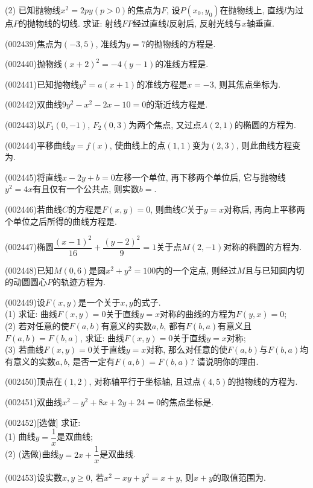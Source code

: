 (2) 已知抛物线$x^2=2py(p>0)$的焦点为$F$,
设$P(x_0,y_0)$在抛物线上, 直线$l$为过点$P$的抛物线的切线. 求证: 射线$FP$经过直线$l$反射后, 反射光线与$x$轴垂直.
\item (002439)焦点为$(-3,5)$, 准线为$y=7$的抛物线的方程是.
\item (002440)抛物线$(x+2)^2=-4(y-1)$的准线方程是.
\item (002441)已知抛物线$y^2=a(x+1)$的准线方程是$x=-3$, 则其焦点坐标为.
\item (002442)双曲线$9y^2-x^2-2x-10=0$的渐近线方程是.
\item (002443)以$F_1(0,-1)$, $F_2(0,3)$为两个焦点, 又过点$A(2,1)$的椭圆的方程为.
\item (002444)平移曲线$y=f(x)$, 使曲线上的点$(1,1)$变为$(2,3)$, 则此曲线方程变为.
\item (002445)将直线$x-2y+b=0$左移一个单位, 再下移两个单位后, 它与抛物线$y^2=4x$有且仅有一个公共点, 则实数$b=$.
\item (002446)若曲线$C$的方程是$F(x,y)=0$, 则曲线$C$关于$y=x$对称后,
再向上平移两个单位之后所得的曲线方程是.
\item (002447)椭圆$\dfrac{(x-1)^2}{16}+\dfrac{(y-2)^2}{9}=1$关于点$M(2,-1)$对称的椭圆的方程为.
\item (002448)已知$M(0,6)$是圆$x^2+y^2=100$内的一个定点, 则经过$M$且与已知圆内切的动圆圆心$P$的轨迹方程为.
\item (002449)设$F(x,y)$是一个关于$x,y$的式子.\\ 
(1) 求证: 曲线$F(x,y)=0$关于直线$y=x$对称的曲线的方程为$F(y,x)=0$;\\ 
(2) 若对任意的使$F(a,b)$有意义的实数$a,b$, 都有$F(b,a)$有意义且$F(a,b)=F(b,a)$,
求证: 曲线$F(x,y)=0$关于直线$y=x$对称;\\ 
(3) 若曲线$F(x,y)=0$关于直线$y=x$对称,
那么对任意的使$F(a,b)$与$F(b,a)$均有意义的实数$a,b$, 是否一定有$F(a,b)=F(b,a)$? 请说明你的理由.
\item (002450)顶点在$(1,2)$, 对称轴平行于坐标轴, 且过点$(4,5)$的抛物线的方程为.
\item (002451)双曲线$x^2-y^2+8x+2y+24=0$的焦点坐标是.
\item (002452)[选做]
求证:\\ 
(1) 曲线$y=\dfrac{1}{x}$是双曲线;\\ 
(2) (选做)曲线$y=2x+\dfrac{1}{x}$是双曲线.
\item (002453)设实数$x,y\geq 0$, 若$x^2-xy+y^2=x+y$, 则$x+y$的取值范围为.
